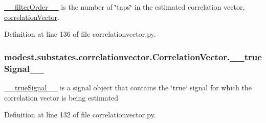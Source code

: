 \hyperlink{classmodest_1_1substates_1_1correlationvector_1_1CorrelationVector_a6454cf8c143629a28cf684f6abbf4830}{\+\_\+\+\_\+filter\+Order\+\_\+\+\_\+} is the number of \char`\"{}taps\char`\"{} in the estimated correlation vector, \hyperlink{classmodest_1_1substates_1_1correlationvector_1_1CorrelationVector_a81da583ee9077067b6aaa354fd8a8c49}{correlation\+Vector}. 



Definition at line 136 of file correlationvector.\+py.

\subsubsection[{\texorpdfstring{\+\_\+\+\_\+true\+Signal\+\_\+\+\_\+}{__trueSignal__}}]{\setlength{\rightskip}{0pt plus 5cm}modest.\+substates.\+correlationvector.\+Correlation\+Vector.\+\_\+\+\_\+true\+Signal\+\_\+\+\_\+\hspace{0.3cm}{\ttfamily [private]}}\hypertarget{classmodest_1_1substates_1_1correlationvector_1_1CorrelationVector_af2f52cea1c695f36dd100f529c322e94}{}\label{classmodest_1_1substates_1_1correlationvector_1_1CorrelationVector_af2f52cea1c695f36dd100f529c322e94}


\hyperlink{classmodest_1_1substates_1_1correlationvector_1_1CorrelationVector_af2f52cea1c695f36dd100f529c322e94}{\+\_\+\+\_\+true\+Signal\+\_\+\+\_\+} is a signal object that contains the \char`\"{}true\char`\"{} signal for which the correlation vector is being estimated 



Definition at line 132 of file correlationvector.\+py.

